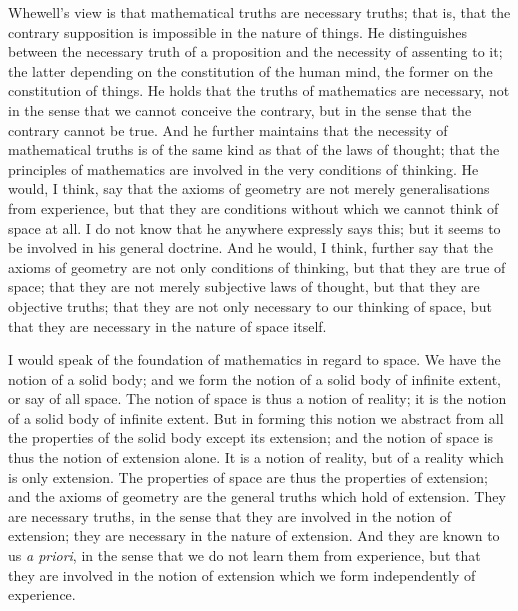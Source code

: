 \documentclass[11pt,a4paper]{article}
\begin{document}
Whewell's view is that mathematical truths are necessary truths; that
is, that the contrary supposition is impossible in the nature of things.
He distinguishes between the necessary truth of a proposition and the
necessity of assenting to it; the latter depending on the constitution of
the human mind, the former on the constitution of things. He holds that
the truths of mathematics are necessary, not in the sense that we cannot
conceive the contrary, but in the sense that the contrary cannot be
true. And he further maintains that the necessity of mathematical
truths is of the same kind as that of the laws of thought; that the
principles of mathematics are involved in the very conditions of
thinking. He would, I think, say that the axioms of geometry are not
merely generalisations from experience, but that they are conditions
without which we cannot think of space at all. I do not know that he
anywhere expressly says this; but it seems to be involved in his general
doctrine. And he would, I think, further say that the axioms of
geometry are not only conditions of thinking, but that they are true of
space; that they are not merely subjective laws of thought, but that
they are objective truths; that they are not only necessary to our
thinking of space, but that they are necessary in the nature of space
itself.

I would speak of the foundation of mathematics in regard to space. We
have the notion of a solid body; and we form the notion of a solid body
of infinite extent, or say of all space. The notion of space is thus a
notion of reality; it is the notion of a solid body of infinite extent.
But in forming this notion we abstract from all the properties of the
solid body except its extension; and the notion of space is thus the
notion of extension alone. It is a notion of reality, but of a reality
which is only extension. The properties of space are thus the
properties of extension; and the axioms of geometry are the general
truths which hold of extension. They are necessary truths, in the sense
that they are involved in the notion of extension; they are necessary in
the nature of extension. And they are known to us \textit{a priori}, in
the sense that we do not learn them from experience, but that they are
involved in the notion of extension which we form independently of
experience.
\end{document}
